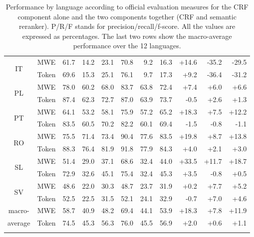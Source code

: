 \documentclass[output=paper,modfonts,nonflat]{langsci/langscibook}
\begin{document}
\begin{table}
{\begin{tabular}{ccrrrrrrrrr}
    \multirow{2}{*}{IT}&   MWE & 61.7 & 14.2 & 23.1 &      70.8  &      9.2  &     16.3 &    +14.6 &   -35.2 &   -29.5\\
    & Token & 69.6 & 15.3 & 25.1 &      76.1  &      9.7  &     17.3 &     +9.2 &   -36.4 &   -31.2\\
    \multirow{2}{*}{PL}&   MWE&  78.0 & 60.2 & 68.0 &      83.7  &     63.8  &     72.4 &     +7.4 &     +6.0 &     +6.6\\
    & Token&  87.4 & 62.3 & 72.7 &      87.0  &     63.9  &     73.7 &    -0.5 &     +2.6 &     +1.3\\
    \multirow{2}{*}{PT}&   MWE&  64.1 & 53.2 & 58.1 &      75.9  &     57.2  &     65.2 &    +18.3 &     +7.5 &    +12.2\\
    & Token&  83.5 & 60.5 & 70.2 &      82.2  &     60.1  &     69.4 &    -1.5 &    -0.8 &    -1.1\\
    \multirow{2}{*}{RO}&   MWE&  75.5 & 71.4 & 73.4 &      90.4  &     77.6  &     83.5 &    +19.8  &    +8.7 &    +13.8\\
    & Token&  88.3 & 76.4 & 81.9 &      91.8  &     77.9  &     84.3 &     +4.0 &     +2.1 &     +3.0\\
    \multirow{2}{*}{SL}&   MWE&  51.4 & 29.0 & 37.1 &      68.6  &     32.4  &     44.0 &    +33.5 &    +11.7 &    +18.7\\
    & Token&  72.9 & 32.6 & 45.1 &      75.4  &     32.4  &     45.3 &     +3.5 &    -0.8 &     +0.5\\
    \multirow{2}{*}{SV}&   MWE&  48.6 & 22.0 & 30.3 &      48.7  &     23.7  &     31.9 &     +0.2 &     +7.7 &     +5.2\\
    & Token&  52.5 & 22.5 & 31.5 &      52.1  &     24.1  &     32.9 &    -0.7 &     +7.0 &     +4.6\\
  \midrule
 {\scriptsize macro-}&   MWE&  58.7 & 40.9 & 48.2 &      69.4  &     44.1  &     53.9 &    +18.3 &     +7.8 &    +11.9\\
{\scriptsize average} & Token&  74.5 & 45.3 & 56.3 &      76.0  &     45.5  &     56.9 &     +2.0 &     +0.6 &     +1.1\\
\lspbottomrule
  \end{tabular}
}
\caption{{ Performance by language according to official evaluation
    measures for the CRF component alone and the two components
    together (CRF and semantic reranker).} P/R/F stands for precision/recall/f-score. All the
  values are expressed as percentages. The last two rows show the
  macro-average performance over the 12
  languages.\label{tab:perfByLang}}
\end{table}
\end{document}
